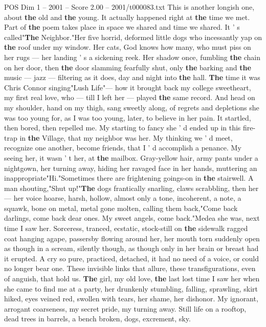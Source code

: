 \begin{textsample}{POS Dim 1 – 2001 – Score 2.00 – 2001/t000083.txt}
This is another longish one, about \textbf{the} old and \textbf{the} young.
It actually happened right at \textbf{the} time we met.
Part of \textbf{the} poem takes place in space we shared and time we shared.
It ' s called"\textbf{The} Neighbor."Her five horrid, deformed little dogs who incessantly yap on \textbf{the} roof under my window.
Her cats, God knows how many, who must piss on her rugs — her landing ' s a sickening reek.
Her shadow once, fumbling \textbf{the} chain on her door, then \textbf{the} door slamming fearfully shut, only \textbf{the} barking and \textbf{the} music — jazz — filtering as it does, day and night into \textbf{the} hall. \textbf{The} time it was Chris Connor singing"Lush Life"— how it brought back my college sweetheart, my first real love, who — till I left her — played \textbf{the} same record.
And head on my shoulder, hand on my thigh, sang sweetly along, of regrets and depletions she was too young for, as I was too young, later, to believe in her pain.
It startled, then bored, then repelled me.
My starting to fancy she ' d ended up in this fire-trap in \textbf{the} Village, that my neighbor was her.
My thinking we ' d meet, recognize one another, become friends, that I ' d accomplish a penance.
My seeing her, it wasn ' t her, at \textbf{the} mailbox.
Gray-yellow hair, army pants under a nightgown, her turning away, hiding her ravaged face in her hands, muttering an inappropriate"Hi."Sometimes there are frightening goings-on in \textbf{the} stairwell.
A man shouting,"Shut up!"\textbf{The} dogs frantically snarling, claws scrabbling, then her — her voice hoarse, harsh, hollow, almost only a tone, incoherent, a note, a squawk, bone on metal, metal gone molten, calling them back,"Come back darlings, come back dear ones.
My sweet angels, come back."Medea she was, next time I saw her.
Sorceress, tranced, ecstatic, stock-still on \textbf{the} sidewalk ragged coat hanging agape, passersby flowing around her, her mouth torn suddenly open as though in a scream, silently though, as though only in her brain or breast had it erupted.
A cry so pure, practiced, detached, it had no need of a voice, or could no longer bear one.
These invisible links that allure, these transfigurations, even of anguish, that hold us. \textbf{The} girl, my old love, \textbf{the} last lost time I saw her when she came to find me at a party, her drunkenly stumbling, falling, sprawling, skirt hiked, eyes veined red, swollen with tears, her shame, her dishonor.
My ignorant, arrogant coarseness, my secret pride, my turning away.
Still life on a rooftop, dead trees in barrels, a bench broken, dogs, excrement, sky.

\end{textsample}
